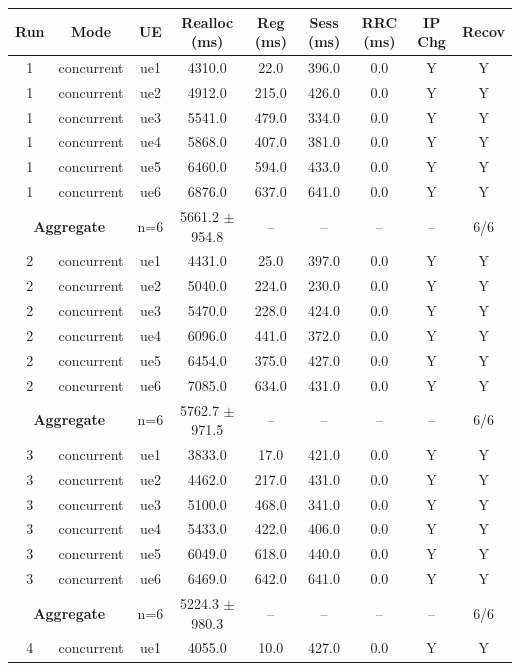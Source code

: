 \begin{table}[ht]
\centering
\begin{tabular}{|c|c|c|c|c|c|c|c|c|}
\hline
Run & Mode & UE & Realloc (ms) & Reg (ms) & Sess (ms) & RRC (ms) & IP Chg & Recov \\
\hline
1 & concurrent & ue1 & 4310.0 & 22.0 & 396.0 & 0.0 & Y & Y \\
1 & concurrent & ue2 & 4912.0 & 215.0 & 426.0 & 0.0 & Y & Y \\
1 & concurrent & ue3 & 5541.0 & 479.0 & 334.0 & 0.0 & Y & Y \\
1 & concurrent & ue4 & 5868.0 & 407.0 & 381.0 & 0.0 & Y & Y \\
1 & concurrent & ue5 & 6460.0 & 594.0 & 433.0 & 0.0 & Y & Y \\
1 & concurrent & ue6 & 6876.0 & 637.0 & 641.0 & 0.0 & Y & Y \\
\multicolumn{2}{|c|}{\textbf{Aggregate}} & n=6 & 5661.2 $\pm$ 954.8 & -- & -- & -- & -- & 6/6 \\
\hline
2 & concurrent & ue1 & 4431.0 & 25.0 & 397.0 & 0.0 & Y & Y \\
2 & concurrent & ue2 & 5040.0 & 224.0 & 230.0 & 0.0 & Y & Y \\
2 & concurrent & ue3 & 5470.0 & 228.0 & 424.0 & 0.0 & Y & Y \\
2 & concurrent & ue4 & 6096.0 & 441.0 & 372.0 & 0.0 & Y & Y \\
2 & concurrent & ue5 & 6454.0 & 375.0 & 427.0 & 0.0 & Y & Y \\
2 & concurrent & ue6 & 7085.0 & 634.0 & 431.0 & 0.0 & Y & Y \\
\multicolumn{2}{|c|}{\textbf{Aggregate}} & n=6 & 5762.7 $\pm$ 971.5 & -- & -- & -- & -- & 6/6 \\
\hline
3 & concurrent & ue1 & 3833.0 & 17.0 & 421.0 & 0.0 & Y & Y \\
3 & concurrent & ue2 & 4462.0 & 217.0 & 431.0 & 0.0 & Y & Y \\
3 & concurrent & ue3 & 5100.0 & 468.0 & 341.0 & 0.0 & Y & Y \\
3 & concurrent & ue4 & 5433.0 & 422.0 & 406.0 & 0.0 & Y & Y \\
3 & concurrent & ue5 & 6049.0 & 618.0 & 440.0 & 0.0 & Y & Y \\
3 & concurrent & ue6 & 6469.0 & 642.0 & 641.0 & 0.0 & Y & Y \\
\multicolumn{2}{|c|}{\textbf{Aggregate}} & n=6 & 5224.3 $\pm$ 980.3 & -- & -- & -- & -- & 6/6 \\
\hline
4 & concurrent & ue1 & 4055.0 & 10.0 & 427.0 & 0.0 & Y & Y \\

\end{tabular}
\end{table}
